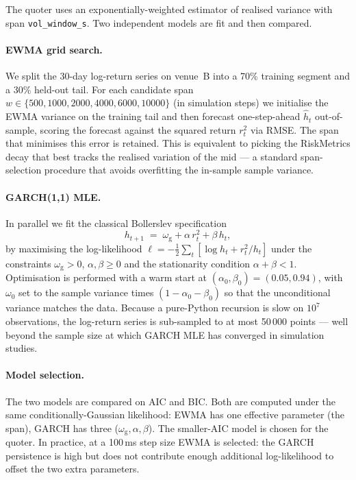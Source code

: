 The quoter uses an exponentially-weighted estimator of realised
variance with span \texttt{vol\_window\_s}. Two independent models are
fit and then compared.

\paragraph{EWMA grid search.} We split the 30-day log-return series
on venue~B into a 70\% training segment and a 30\% held-out tail.
For each candidate span $w \in \{500, 1000, 2000, 4000, 6000, 10000\}$
(in simulation steps) we initialise the EWMA variance on the training
tail and then forecast one-step-ahead $\hat h_t$ out-of-sample,
scoring the forecast against the squared return $r_t^2$ via RMSE.
The span that minimises this error is retained. This is equivalent
to picking the RiskMetrics decay that best tracks the realised
variation of the mid --- a standard span-selection procedure that
avoids overfitting the in-sample sample variance.

\paragraph{GARCH(1,1) MLE.} In parallel we fit the classical
Bollerslev specification
\[
h_{t+1} \;=\; \omega_{\text{g}} + \alpha\,r_t^2 + \beta\,h_t,
\]
by maximising the log-likelihood
$\ell = -\tfrac12 \sum_t \left[\log h_t + r_t^2 / h_t\right]$
under the constraints $\omega_{\text{g}} > 0$, $\alpha, \beta \ge 0$
and the stationarity condition $\alpha + \beta < 1$. Optimisation
is performed with a warm start at
$(\alpha_0, \beta_0) = (0.05, 0.94)$, with $\omega_0$ set to the
sample variance times $(1-\alpha_0-\beta_0)$ so that the
unconditional variance matches the data. Because a pure-Python
recursion is slow on $10^7$ observations, the log-return series is
sub-sampled to at most 50\,000 points --- well beyond the sample size
at which GARCH MLE has converged in simulation studies.

\paragraph{Model selection.} The two models are compared on AIC and
BIC. Both are computed under the same conditionally-Gaussian
likelihood: EWMA has one effective parameter (the span), GARCH has
three ($\omega_{\text{g}}, \alpha, \beta$). The smaller-AIC model is
chosen for the quoter. In practice, at a 100\,ms step size EWMA is
selected: the GARCH persistence is high but does not contribute enough
additional log-likelihood to offset the two extra parameters.

